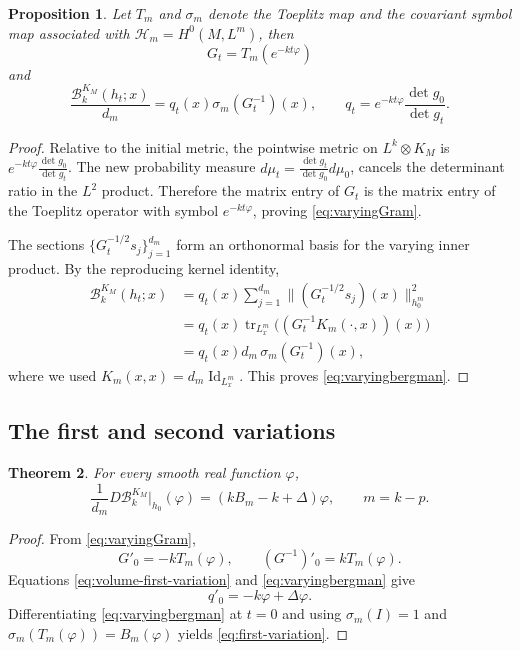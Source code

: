 \documentclass[11pt,reqno]{amsart}
\newtheorem{theorem}{Theorem}[section]
\theoremstyle{corollary}
\theoremstyle{conjecture}
\theoremstyle{assumption}
\theoremstyle{proposition}
\newtheorem{proposition}[theorem]{Proposition}
\theoremstyle{remark}
\numberwithin{equation}{section}
\begin{document}
\begin{proposition}\label{prop:varying-identity}
Let $T_m$ and $\sigma_m$ denote the Toeplitz map and the covariant symbol map associated with $\mathcal H_m=H^0(M,L^m)$, then
\begin{equation}\label{eq:varyingGram}
G_t=T_m(e^{-kt\varphi})
\end{equation}
and
\begin{equation}\label{eq:varyingbergman}
\frac{\mathcal B^{K_M}_k(h_t;x)}{d_m}=q_t(x) \sigma_m(G_t^{-1})(x),\qquad q_t=e^{-kt\varphi}\frac{\det g_0}{\det g_t}.
\end{equation}
\end{proposition}
\begin{proof}
Relative to the initial metric, the pointwise metric on $L^k\otimes K_M$ is $e^{-kt\varphi}\frac{\det g_0}{\det g_t}$. The new probability measure $d\mu_t=\frac{\det g_t}{\det g_0}d\mu_0$, cancels the determinant ratio in the $L^2$ product. Therefore the matrix entry of $G_t$ is the matrix entry of the Toeplitz operator with symbol $e^{-kt\varphi}$, proving \eqref{eq:varyingGram}.

The sections $\{G_t^{-1/2}s_j\}_{j=1}^{d_m}$ form an orthonormal basis for the varying inner product. By the reproducing kernel identity,
\[
\begin{aligned}
\mathcal B^{K_M}_k(h_t;x)
&=q_t(x)\sum_{j=1}^{d_m}\|(G_t^{-1/2}s_j)(x)\|_{h_0^m}^2\\
&=q_t(x)\operatorname{tr}_{L_x^m}\bigl((G_t^{-1}K_m(\cdot,x))(x)\bigr)\\
&=q_t(x)d_m\,\sigma_m(G_t^{-1})(x),
\end{aligned}
\]
where we used $K_m(x,x)=d_m\operatorname{Id}_{L_x^m}$. This proves \eqref{eq:varyingbergman}.
\end{proof}

\subsection{The first and second variations}\label{subsec:first-second-variations}

\begin{theorem}\label{thm:first-variation}
For every smooth real function $\varphi$,
\begin{equation}\label{eq:first-variation}
\frac{1}{d_m}D\mathcal B^{K_M}_k|_{h_0}(\varphi)=\left( kB_m-k+\Delta\right)\varphi,\qquad m=k-p.
\end{equation}
\end{theorem}
\begin{proof}
From \eqref{eq:varyingGram}, 
\begin{equation}\label{eq:first-variation--Gram}
G'_0=-kT_m(\varphi),\qquad (G^{-1})'_0=kT_m(\varphi).
\end{equation}
Equations \eqref{eq:volume-first-variation} and \eqref{eq:varyingbergman} give
\begin{equation}\label{eq:first-variation--q}
q'_0=-k\varphi+\Delta \varphi.
\end{equation}
Differentiating \eqref{eq:varyingbergman} at $t=0$ and using $\sigma_m(I)=1$ and $\sigma_m(T_m(\varphi))=B_m(\varphi)$ yields \eqref{eq:first-variation}.
\end{proof}
\end{document}
